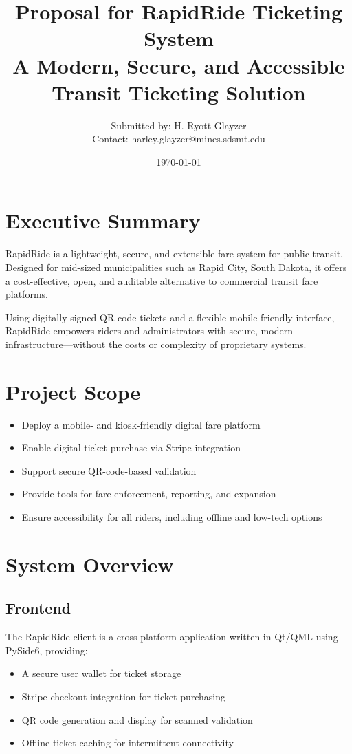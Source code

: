 \documentclass[12pt]{article}
\title{Proposal for RapidRide Ticketing System\\[0.5em] \large A Modern, Secure, and Accessible Transit Ticketing Solution}
\author{Submitted by: H. Ryott Glayzer\\Contact: harley.glayzer@mines.sdsmt.edu}
\date{\today}
\begin{document}
\maketitle
\thispagestyle{empty}
\newpage

\tableofcontents
\newpage

\section{Executive Summary}
RapidRide is a lightweight, secure, and extensible fare system for public transit. Designed for mid-sized municipalities such as Rapid City, South Dakota, it offers a cost-effective, open, and auditable alternative to commercial transit fare platforms.

Using digitally signed QR code tickets and a flexible mobile-friendly interface, RapidRide empowers riders and administrators with secure, modern infrastructure—without the costs or complexity of proprietary systems.

\section{Project Scope}
\begin{itemize}
    \item Deploy a mobile- and kiosk-friendly digital fare platform
    \item Enable digital ticket purchase via Stripe integration
    \item Support secure QR-code-based validation
    \item Provide tools for fare enforcement, reporting, and expansion
    \item Ensure accessibility for all riders, including offline and low-tech options
\end{itemize}

\section{System Overview}
\subsection{Frontend}
The RapidRide client is a cross-platform application written in Qt/QML using PySide6, providing:
\begin{itemize}
    \item A secure user wallet for ticket storage
    \item Stripe checkout integration for ticket purchasing
    \item QR code generation and display for scanned validation
    \item Offline ticket caching for intermittent connectivity
\end{itemize}
\end{document}
